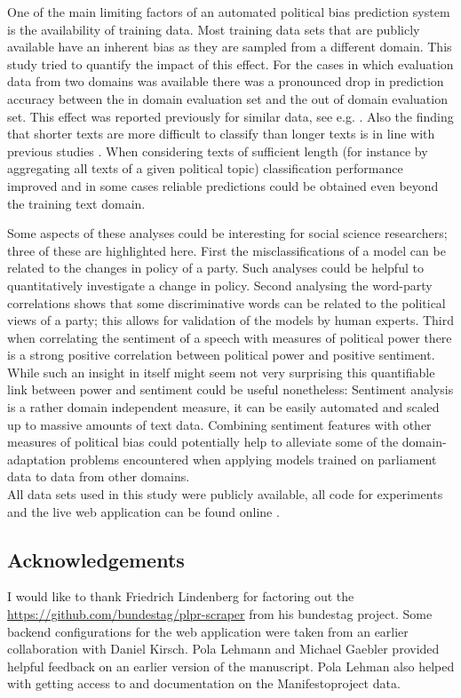 \documentclass[runningheads,a4paper]{llncs}
\begin{document}
One of the main limiting factors of an automated political bias prediction system is the availability of training data. Most training data sets that are publicly available have an inherent bias as they are sampled from a different domain. This study tried to quantify the impact of this effect. 
For the cases in which evaluation data from two domains was available there was a pronounced drop in prediction accuracy between the in domain evaluation set and the out of domain evaluation set. This effect was reported previously for similar data, see e.g. \cite{Yu2008}. Also the finding that shorter texts are more difficult to classify than longer texts is in line with previous studies \cite{Hirst2014}. When considering texts of sufficient length (for instance by aggregating all texts of a given political topic) classification performance improved and in some cases reliable predictions could be obtained even beyond the training text domain.

Some aspects of these analyses could be interesting for social science researchers; three of these are highlighted here.
First the misclassifications of a model can be related to the changes in policy of a party. Such analyses could be helpful to quantitatively investigate a change in policy. Second analysing the word-party correlations shows that some discriminative words can be related to the political views of a party; this allows for validation of the models by human experts. Third when correlating the sentiment of a speech with measures of political power there is a strong positive correlation between political power and positive sentiment. While such an insight in itself might seem not very surprising this quantifiable link between power and sentiment could be useful nonetheless: Sentiment analysis is a rather domain independent measure, it can be easily automated and scaled up to massive amounts of text data. Combining sentiment features with other measures of political bias could potentially help to alleviate some of the domain-adaptation problems encountered when applying models trained on parliament data to data from other domains. \\


All data sets used in this study were publicly available, all code for experiments and the live web application can be found online \cite{fipi, fipidemo}.

\subsection*{Acknowledgements}
I would like to thank Friedrich Lindenberg for factoring out the \url{https://github.com/bundestag/plpr-scraper} from his bundestag project. Some backend configurations for the web application were taken from an earlier collaboration with Daniel Kirsch. Pola Lehmann and Michael Gaebler provided helpful feedback on an earlier version of the manuscript. Pola Lehman also helped with getting access to and documentation on the Manifestoproject data. 
%
\small{

 
}
\end{document}
